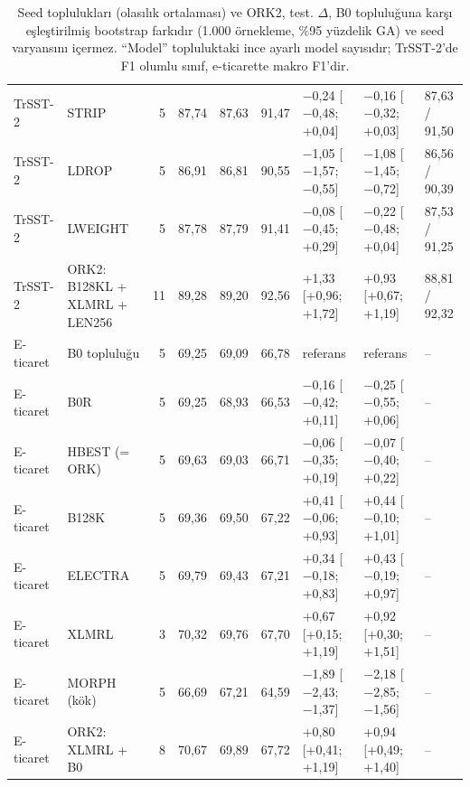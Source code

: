 \documentclass[11pt]{article}
\begin{document}
\begin{table}[!htbp]
{\begin{tabular}{llrrrrlll}
TrSST-2 & STRIP & \mbox{5} & \mbox{87,74} & \mbox{87,63} & \mbox{91,47} & $-$0,24 [$-$0,48; +0,04] & $-$0,16 [$-$0,32; +0,03] & 87,63 / 91,50 \\
TrSST-2 & LDROP & \mbox{5} & \mbox{86,91} & \mbox{86,81} & \mbox{90,55} & $-$1,05 [$-$1,57; $-$0,55] & $-$1,08 [$-$1,45; $-$0,72] & 86,56 / 90,39 \\
TrSST-2 & LWEIGHT & \mbox{5} & \mbox{87,78} & \mbox{87,79} & \mbox{91,41} & $-$0,08 [$-$0,45; +0,29] & $-$0,22 [$-$0,48; +0,04] & 87,53 / 91,25 \\
TrSST-2 & ORK2: B128KL + XLMRL + LEN256 & \mbox{11} & \mbox{89,28} & \mbox{89,20} & \mbox{92,56} & +1,33 [+0,96; +1,72] & +0,93 [+0,67; +1,19] & 88,81 / 92,32 \\
E-ticaret & B0 topluluğu & \mbox{5} & \mbox{69,25} & \mbox{69,09} & \mbox{66,78} & referans & referans & – \\
E-ticaret & B0R & \mbox{5} & \mbox{69,25} & \mbox{68,93} & \mbox{66,53} & $-$0,16 [$-$0,42; +0,11] & $-$0,25 [$-$0,55; +0,06] & – \\
E-ticaret & HBEST (= ORK) & \mbox{5} & \mbox{69,63} & \mbox{69,03} & \mbox{66,71} & $-$0,06 [$-$0,35; +0,19] & $-$0,07 [$-$0,40; +0,22] & – \\
E-ticaret & B128K & \mbox{5} & \mbox{69,36} & \mbox{69,50} & \mbox{67,22} & +0,41 [$-$0,06; +0,93] & +0,44 [$-$0,10; +1,01] & – \\
E-ticaret & ELECTRA & \mbox{5} & \mbox{69,79} & \mbox{69,43} & \mbox{67,21} & +0,34 [$-$0,18; +0,83] & +0,43 [$-$0,19; +0,97] & – \\
E-ticaret & XLMRL & \mbox{3} & \mbox{70,32} & \mbox{69,76} & \mbox{67,70} & +0,67 [+0,15; +1,19] & +0,92 [+0,30; +1,51] & – \\
E-ticaret & MORPH (kök) & \mbox{5} & \mbox{66,69} & \mbox{67,21} & \mbox{64,59} & $-$1,89 [$-$2,43; $-$1,37] & $-$2,18 [$-$2,85; $-$1,56] & – \\
E-ticaret & ORK2: XLMRL + B0 & \mbox{8} & \mbox{70,67} & \mbox{69,89} & \mbox{67,72} & +0,80 [+0,41; +1,19] & +0,94 [+0,49; +1,40] & – \\
\bottomrule
\end{tabular}
}
\caption{Seed toplulukları (olasılık ortalaması) ve ORK2, test. $\Delta$, B0 topluluğuna karşı eşleştirilmiş bootstrap farkıdır (1.000 örnekleme, \%95 yüzdelik GA) ve seed varyansını içermez. ``Model'' topluluktaki ince ayarlı model sayısıdır; TrSST-2'de F1 olumlu sınıf, e-ticarette makro F1'dir.}
\label{tab:10}
\end{table}
\end{document}
